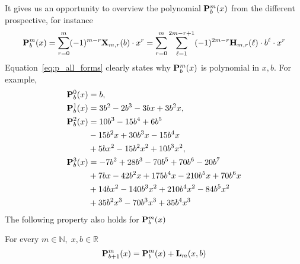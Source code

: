 It gives us an opportunity to overview the polynomial ${\mathbf{P}}\sp{m} \sb{b}(x)$ from the different prospective,
for instance
\begin{equation}
    \label{eq:p_all_forms}
    {\mathbf{P}}\sp{m} \sb{b}(x)
    =\sum_{r=0}^{m} (-1)^{m-r} {\mathbf{X}}\sb{m,r} (b) \cdot x^r
    =\sum_{r=0}^{m} \sum_{\ell=1}^{2m-r+1} (-1)^{2m-r} {\mathbf{H}} \sb{m,r} (\ell) \cdot b^\ell \cdot x^r
\end{equation}
Equation~\eqref{eq:p_all_forms} clearly states why ${\mathbf{P}}\sp{m} \sb{b}(x)$ is polynomial in $x,b$.
For example,
\begin{equation*}
    \begin{split}
        {\mathbf{P}}\sp{0} \sb{b}(x)
        &=b, \\
        {\mathbf{P}}\sp{1} \sb{b}(x)
        &=3 b^2 - 2 b^3 - 3 b x + 3 b^2 x, \\
        {\mathbf{P}}\sp{2} \sb{b}(x)
        &=10 b^3 - 15 b^4 + 6 b^5 \\
        &- 15 b^2 x + 30 b^3 x - 15 b^4 x \\
        &+ 5 b x^2 - 15 b^2 x^2 + 10 b^3 x^2, \\
        {\mathbf{P}}\sp{3} \sb{b}(x)
        &=-7 b^2 + 28 b^3 - 70 b^5 + 70 b^6 - 20 b^7 \\
        &+ 7 b x - 42 b^2 x + 175 b^4 x - 210 b^5 x + 70 b^6 x \\
        &+ 14 b x^2 - 140 b^3 x^2 + 210 b^4 x^2 - 84 b^5 x^2 \\
        &+ 35 b^2 x^3 - 70 b^3 x^3 + 35 b^4 x^3
    \end{split}
\end{equation*}
The following property also holds for ${\mathbf{P}}\sp{m} \sb{b}(x)$
\begin{ppty}
    \label{prop_p_identity}
    For every $m\in \mathbb{N}, \; x,b\in\mathbb{R}$
    \begin{equation*}
        {\mathbf{P}}\sp{m} \sb{b+1}(x) = {\mathbf{P}}\sp{m} \sb{b}(x) + {\mathbf{L}}\sb{m}(x,b)
    \end{equation*}
\end{ppty}
